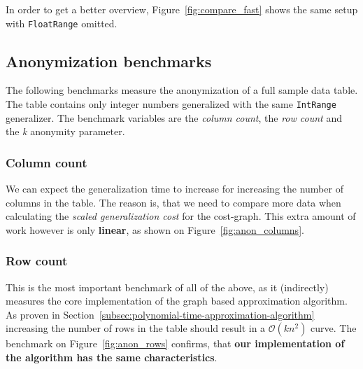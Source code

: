 In order to get a better overview, Figure~\ref{fig:compare_fast} shows the same setup with \texttt{FloatRange} omitted.

\vspace{\baselineskip}


\vspace{\baselineskip}


\subsection{Anonymization benchmarks}

The following benchmarks measure the anonymization of a full sample data table. The table contains only integer numbers generalized with the same \texttt{IntRange} generalizer. The benchmark variables are the \emph{column count}, the \emph{row count} and the \emph{k} anonymity parameter.

\subsubsection{Column count}

We can expect the generalization time to increase for increasing the number of columns in the table. The reason is, that we need to compare more data when calculating the \emph{scaled generalization cost} for the cost-graph. This extra amount of work however is only \textbf{linear}, as shown on Figure~\ref{fig:anon_columns}.

\vspace{\baselineskip}


\subsubsection{Row count}

This is the most important benchmark of all of the above, as it (indirectly) measures the core implementation of the graph based approximation algorithm. As proven in Section~\ref{subsec:polynomial-time-approximation-algorithm} increasing the number of rows in the table should result in a \(\mathcal{O}(kn^2)\) curve. The benchmark on Figure~\ref{fig:anon_rows} confirms, that \textbf{our implementation of the algorithm has the same characteristics}.

\vspace{\baselineskip}


